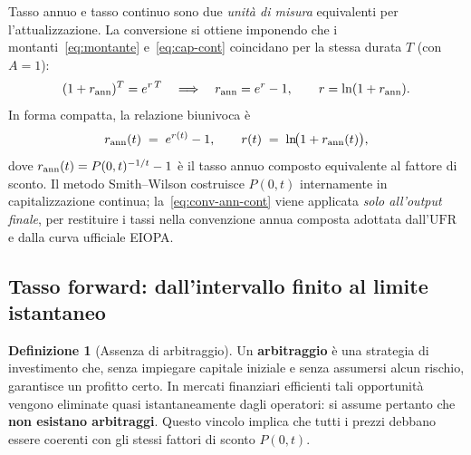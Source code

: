 \documentclass[11pt,a4paper]{article}
\theoremstyle{plain}
\theoremstyle{definition}
\newtheorem{definizione}[teorema]{Definizione}
\theoremstyle{remark}
\newcommand{\UFR}{\ensuremath{\mathrm{UFR}}}
\begin{document}

Tasso annuo e tasso continuo sono due \emph{unit\`a di misura} equivalenti per
l'attualizzazione. La conversione si ottiene imponendo che i montanti~\eqref{eq:montante}
e~\eqref{eq:cap-cont} coincidano per la stessa durata $T$ (con $A=1$):
\[
  (1+r_{\rm ann})^T = e^{r\,T}
  \quad\Longrightarrow\quad
  r_{\rm ann} = e^{r} - 1,\qquad r = \ln(1+r_{\rm ann}).
\]
In forma compatta, la relazione biunivoca \`e
\begin{equation}
  r_{\rm ann}(t) \;=\; e^{r(t)} - 1,
  \qquad
  r(t) \;=\; \ln\!\bigl(1 + r_{\rm ann}(t)\bigr),
  \label{eq:conv-ann-cont}
\end{equation}
dove $r_{\rm ann}(t) = P(0,t)^{-1/t}-1$ \`e il tasso annuo composto equivalente al fattore
di sconto. Il metodo Smith--Wilson costruisce $P(0,t)$ internamente in capitalizzazione
continua; la~\eqref{eq:conv-ann-cont} viene applicata \emph{solo all'output finale}, per
restituire i tassi nella convenzione annua composta adottata dall'$\UFR$ e dalla curva
ufficiale EIOPA.

\subsection{Tasso forward: dall'intervallo finito al limite istantaneo}


\begin{definizione}[Assenza di arbitraggio]
\label{def:noarb}
Un \textbf{arbitraggio} \`e una strategia di investimento che, senza impiegare capitale
iniziale e senza assumersi alcun rischio, garantisce un profitto certo. In mercati
finanziari efficienti tali opportunit\`a vengono eliminate quasi istantaneamente dagli
operatori: si assume pertanto che \textbf{non esistano arbitraggi}. Questo vincolo implica
che tutti i prezzi debbano essere coerenti con gli stessi fattori di sconto $P(0,t)$.
\end{definizione}
\end{document}
